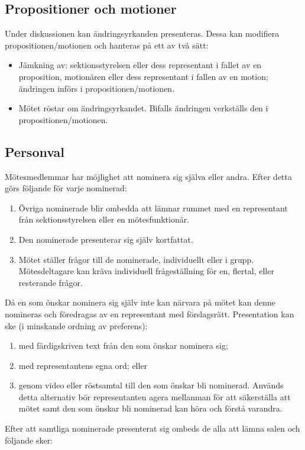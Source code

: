 \documentclass[11pt, includeaddress]{classes/cthit}
\begin{document}
\subsection{Propositioner och motioner}
Under diskussionen kan ändringsyrkanden presenteras.
Dessa kan modifiera propositionen/motionen och hanteras på ett av två sätt:
\begin{itemize}
    \item Jämkning av: sektionsstyrelsen eller dess representant i fallet av en proposition, motionären eller dess representant i fallen av en motion; ändringen införs i propositionen/motionen.
    \item Mötet röstar om ändringsyrkandet. Bifalls ändringen verkställs den i propositionen/motionen.
\end{itemize}

\subsection{Personval}
Mötesmedlemmar har möjlighet att nominera sig själva eller andra. Efter detta görs följande för varje nominerad:
\begin{enumerate}
    \item Övriga nominerade blir ombedda att lämnar rummet med en representant från sektionsstyrelsen eller en mötesfunktionär.
    \item Den nominerade presenterar sig själv kortfattat.
    \item Mötet ställer frågor till de nominerade, individuellt eller i grupp. Mötesdeltagare kan
kräva individuell frågeställning för en, flertal, eller resterande frågor.
\end{enumerate}
Då en som önskar nominera sig själv inte kan närvara på mötet kan denne nomineras
och föredragas av en representant med förslagsrätt. Presentation kan ske (i minskande
ordning av preferens):
\begin{enumerate}[label=(\alph*)]
    \item med färdigskriven text från den som önskar nominera sig;
    \item med representantens egna ord; eller
    \item genom video eller röstsamtal till den som önskar bli nominerad. Används detta alternativ bör representanten agera mellanman för att säkerställa att mötet samt den som önskar bli nominerad kan höra och förstå varandra.
\end{enumerate}
Efter att samtliga nominerade presenterat sig ombeds de alla att lämna salen och följande sker:
\end{document}
